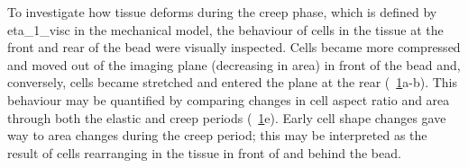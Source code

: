 \begin{figure}
{%
}\label{fig:cell_tracking}
\end{figure}
To investigate how tissue deforms during the creep phase, which is defined by \gls{eta_1_visc} in the mechanical model, the behaviour of cells in the tissue at the front and rear of the bead were visually inspected.
Cells became more compressed and moved out of the imaging plane (decreasing in area) in front of the bead and, conversely, cells became stretched and entered  the plane at the rear (\figurename~\ref{fig:cell_tracking}a-b).
This behaviour may be quantified by comparing changes in cell aspect ratio and area through both the elastic and creep periods (\figurename~\ref{fig:cell_tracking}e).
Early cell shape changes gave way to area changes during the creep period; this may be interpreted as the result of cells rearranging in the tissue in front of and behind the bead.


